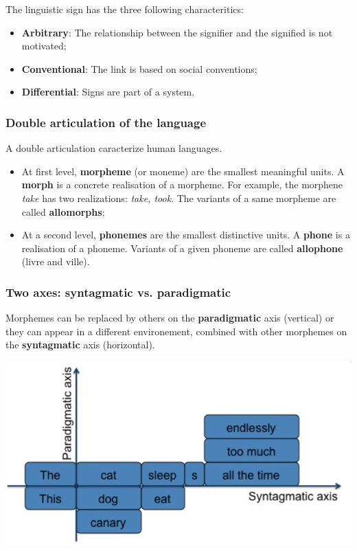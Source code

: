 The linguistic sign has the three following characteritics:

\begin{itemize}
	\item \textbf{Arbitrary}: The relationship between the signifier and the signified is not motivated;
	\item \textbf{Conventional}: The link is based on social conventions;
	\item \textbf{Differential}: Signs are part of a system.
\end{itemize}


\subsubsection{Double articulation of the language}

A double articulation caracterize human languages.

\begin{itemize}
	\item At first level, \textbf{morpheme} (or moneme) are the smallest meaningful units. A \textbf{morph} is a concrete realisation of a morpheme. For example, the morphene \textit{take} has two realizations: \textit{take, took}. The variants of a same morpheme are called \textbf{allomorphs};
	\item At a second level, \textbf{phonemes} are the smallest distinctive units. A \textbf{phone} is a realisation of a phoneme. Variants of a given phoneme are called \textbf{allophone} (livre and ville).
\end{itemize}

\subsubsection{Two axes: syntagmatic vs. paradigmatic}

\noindent
\begin{minipage}{.4\textwidth}
	Morphemes can be replaced by others on the \textbf{paradigmatic} axis (vertical) or they can appear in a different environement, combined with other morphemes on the \textbf{syntagmatic} axis (horizontal).
\end{minipage}%
\begin{minipage}{.6\textwidth}
	\centering
	\includegraphics[scale=0.4]{images/02_axis.png}
\end{minipage}

